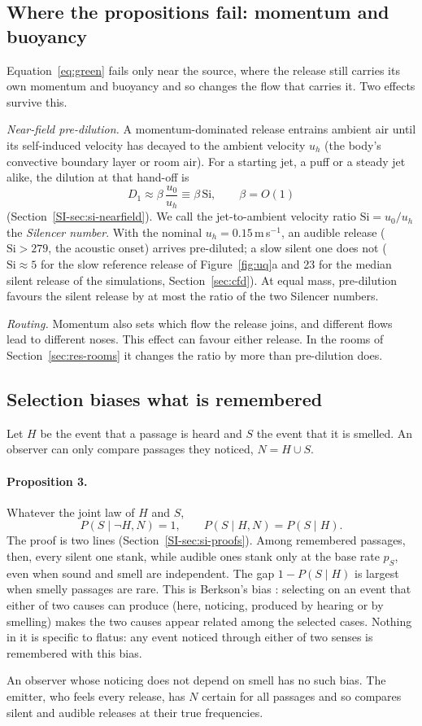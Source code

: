 \subsection{Where the propositions fail: momentum and buoyancy}
\label{sec:nonlinear}
Equation~\eqref{eq:green} fails only near the source, where the release still carries its own momentum and buoyancy
and so changes the flow that carries it. Two effects survive this.

\emph{Near-field pre-dilution.} A momentum-dominated release entrains ambient air until its self-induced velocity
has decayed to the ambient velocity $u_h$ (the body's convective boundary layer or room air). For a starting jet, a
puff or a steady jet alike, the dilution at that hand-off is
\begin{equation}
  D_1 \approx \beta\,\frac{u_0}{u_h} \equiv \beta\,\mathrm{Si}, \qquad \beta = O(1)
  \label{eq:silencer}
\end{equation}
(Section~\ref{SI-sec:si-nearfield}). We call the jet-to-ambient velocity ratio $\mathrm{Si} = u_0/u_h$ the
\emph{Silencer number}. With the nominal
$u_h = 0.15$\,m\,s$^{-1}$, an audible release ($\mathrm{Si} > 279$, the acoustic onset) arrives pre-diluted; a slow
silent one does not ($\mathrm{Si} \approx 5$ for the slow reference release of Figure~\ref{fig:uq}a and 23 for the median silent
release of the simulations, Section~\ref{sec:cfd}). At equal mass, pre-dilution favours
the silent release by at most the ratio of the two Silencer numbers.

\emph{Routing.} Momentum also sets which flow the release joins, and different flows lead to different noses. This
effect can favour either release. In the rooms of Section~\ref{sec:res-rooms} it changes the ratio by more than
pre-dilution does.

\subsection{Selection biases what is remembered}
\label{sec:thm3}
Let $H$ be the event that a passage is heard and $S$ the event that it is smelled. An observer can only compare
passages they noticed, $N = H\cup S$.

\paragraph{Proposition 3.}
Whatever the joint law of $H$ and $S$,
\begin{equation}
  P(S \mid \lnot H, N) = 1, \qquad P(S \mid H, N) = P(S \mid H).
  \label{eq:berkson}
\end{equation}
The proof is two lines (Section~\ref{SI-sec:si-proofs}). Among remembered passages, then, every silent one stank, while
audible ones stank only at the base rate $p_S$, even when sound and smell are independent. The gap $1-P(S\mid H)$ is
largest when smelly passages are rare. This is Berkson's bias \cite{berkson1946,snoep2014}: selecting on an event that
either of two causes can produce (here, noticing, produced by hearing or by smelling) makes the two causes appear
related among the selected cases. Nothing in it is specific to flatus: any event noticed through either of two senses
is remembered with this bias.

An observer whose noticing does not depend on smell has no such bias. The emitter, who feels every release, has
$N$ certain for all passages and so compares silent and audible releases at their true frequencies.
